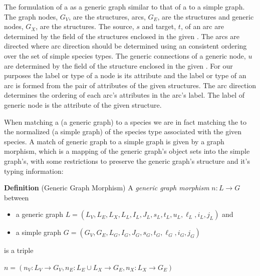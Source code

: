 \documentclass{cekarticle}
\begin{document}
The formulation of a  as a generic graph similar to that
of a  to a simple graph.
The graph nodes, $G_{V}$, are the  structures,
arcs, $G_{E}$, are the  structures and generic nodes, $G_{X}$, are the
 structures.  The source, $s$ and target, $t$, of an arc are determined by the
 field of the  structures enclosed in the given
.  The arcs are directed
where arc direction should be determined using an consistent ordering over the set of simple species
types.
The generic connections of a generic node, $u$ are determined by the  field
of the  structure enclosed in the given .
For our purposes the label or type of a node is its
 attribute and the label or type of an arc is formed from the pair of
 attributes of the given  structures.
The arc direction determines the ordering of each arc's 
attributes in the arc's label.
The label of generic node is the  attribute of the given
 structure.

When matching a  (a generic graph)
to a species we are in fact matching the
 to the normalized
 (a simple graph) of the species type
associated with the given species.  A match of generic graph to a
simple graph is given by a graph morphism, which is a mapping of
the generic graph's object sets into the simple graph's, with some
restrictions to preserve the generic graph's structure and it's
typing information:

\textbf{Definition} (Generic Graph Morphism) A \emph{generic graph
morphism} $n : L \rightarrow G$ between
\begin{itemize}
\item a generic graph $L = (L_{V}, L_{E}, L_{X}, L_{L}, I_{L},
J_{L}, s_{L}, t_{L}, u_{L}, \ell_{L}, i_{L}, j_{L})$ and

\item a simple graph $G = (G_{V}, G_{E}, L_{G}, I_{G}, J_{G},
s_{G}, t_{G}, \ell_{G}, i_{G}, j_{G})$
\end{itemize}
is a triple

$n = (n_{V} : L_{V} \rightarrow G_{V}, n_{E} : L_{E} \cup L_{X}
\rightarrow G_{E}, n_{X} : L_{X} \rightarrow G_{E})$
\end{document}
